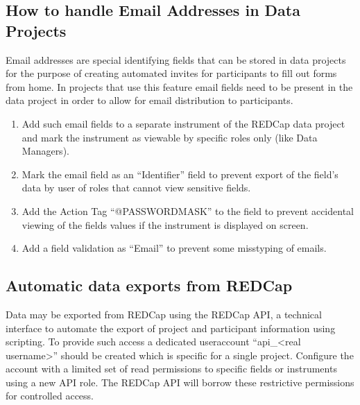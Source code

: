 \documentclass[letterpaper,10pt,english]{sphinxmanual}
\begin{document}
\subsection{How to handle Email Addresses in Data Projects}
\label{\detokenize{ServerAdmin/index:how-to-handle-email-addresses-in-data-projects}}
\sphinxAtStartPar
Email addresses are special identifying fields that can be stored in data projects for the purpose of creating automated invites for participants to fill out forms from home. In projects that use this feature email fields need to be present in the data project in order to allow for email distribution to participants.
\begin{enumerate}
%
\item {} 
\sphinxAtStartPar
Add such email fields to a separate instrument of the REDCap data project and mark the instrument as viewable by specific roles only (like Data Managers).

\item {} 
\sphinxAtStartPar
Mark the email field as an “Identifier” field to prevent export of the field’s data by user  of roles that cannot view sensitive fields.

\item {} 
\sphinxAtStartPar
Add the Action Tag “@PASSWORDMASK” to the field to prevent accidental viewing of the fields values if the instrument is displayed on screen.

\item {} 
\sphinxAtStartPar
Add a field validation as “Email” to prevent some miss\sphinxhyphen{}typing of emails.

\end{enumerate}


\subsection{Automatic data exports from REDCap}
\label{\detokenize{ServerAdmin/index:automatic-data-exports-from-redcap}}
\sphinxAtStartPar
Data may be exported from REDCap using the REDCap API, a technical interface to automate the export of project and participant information using scripting. To provide such access a dedicated user\sphinxhyphen{}account “api\_\textless{}real username\textgreater{}” should be created which is specific for a single project. Configure the account with a limited set of read permissions to specific fields or instruments using a new API role. The REDCap API will borrow these restrictive permissions for controlled access.
\end{document}

